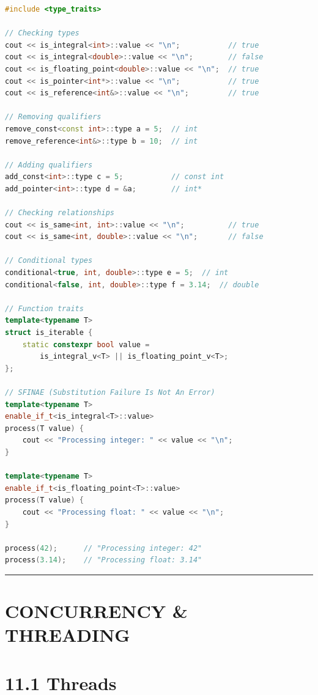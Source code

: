 \begin{lstlisting}[language={C++}]
#include <type_traits>

// Checking types
cout << is_integral<int>::value << "\n";           // true
cout << is_integral<double>::value << "\n";        // false
cout << is_floating_point<double>::value << "\n";  // true
cout << is_pointer<int*>::value << "\n";           // true
cout << is_reference<int&>::value << "\n";         // true

// Removing qualifiers
remove_const<const int>::type a = 5;  // int
remove_reference<int&>::type b = 10;  // int

// Adding qualifiers
add_const<int>::type c = 5;           // const int
add_pointer<int>::type d = &a;        // int*

// Checking relationships
cout << is_same<int, int>::value << "\n";          // true
cout << is_same<int, double>::value << "\n";       // false

// Conditional types
conditional<true, int, double>::type e = 5;  // int
conditional<false, int, double>::type f = 3.14;  // double

// Function traits
template<typename T>
struct is_iterable {
    static constexpr bool value = 
        is_integral_v<T> || is_floating_point_v<T>;
};

// SFINAE (Substitution Failure Is Not An Error)
template<typename T>
enable_if_t<is_integral<T>::value>
process(T value) {
    cout << "Processing integer: " << value << "\n";
}

template<typename T>
enable_if_t<is_floating_point<T>::value>
process(T value) {
    cout << "Processing float: " << value << "\n";
}

process(42);      // "Processing integer: 42"
process(3.14);    // "Processing float: 3.14"
\end{lstlisting}

\begin{center}\rule{0.5\linewidth}{0.5pt}\end{center}

\hypertarget{concurrency-threading}{%
\section{CONCURRENCY \& THREADING}\label{concurrency-threading}}

\hypertarget{threads}{%
\section{11.1 Threads}\label{threads}}

